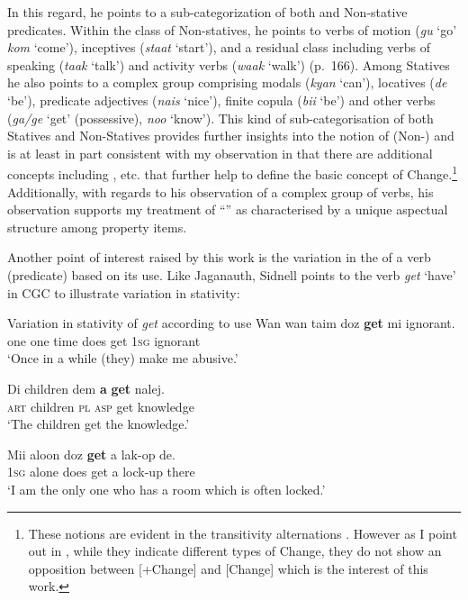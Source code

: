 In this regard, he points to a sub-categorization of both  and
Non-stative predicates.  Within the class of Non-statives, he points to
verbs of motion (\textit{gu} `go' \textit{kom} `come'), inceptives
(\textit{staat} `start'), and a residual class including verbs of
speaking (\textit{taak} `talk') and activity verbs (\textit{waak}
`walk') (p.~166).  Among Statives he also points to a complex group
comprising modals (\textit{kyan} `can'), locatives (\textit{de} `be'),
predicate adjectives (\textit{nais} `nice'), finite copula
(\textit{bii} `be') and other  verbs (\textit{ga/ge} `get'
(possessive), \textit{noo} `know').  This kind of sub-categorisation
of both Statives and Non-Statives provides further insights into the
notion of \mbox{(Non-)} and is at least in part consistent with my
observation in  that there are additional concepts
including \MOTION, \CONTACT etc. that further help to define the basic
concept of Change.\footnote{These notions are evident in the
  transitivity alternations \citep{Levin1993}.  However as I point out
  in , while they indicate different types of Change, they
  do not show an opposition between [+Change] and [\textminus Change] which is
  the interest of this work.}  Additionally, with regards to his
observation of a complex group of  verbs, his observation
supports my treatment of ``'' as characterised by a
unique aspectual structure among property items.

Another point of interest raised by this work is the variation in the
 of a verb (predicate) based on its use.  Like Jaganauth,
Sidnell points to the verb \textit{get} `have' in CGC to illustrate
variation in stativity:

\ea%
\label{ex:2:22}
Variation in stativity of \textit{get}
according to use \citep[167]{Sidnell2002}  
\ea
\gll Wan wan taim  doz \textbf{get} mi ignorant.\\
		one one time does get \textsc{1sg} ignorant\\
\glt `Once in a while (they) make me abusive.'

\ex
    \gll Di children          dem \textbf{a}      \textbf{get} nalej.\\
\textsc{art} children \textsc{pl} \textsc{asp}            get knowledge\\
\glt `The children get the knowledge.'

\ex
   \gll Mii aloon doz \textbf{get} a lak-op    de.\\
\textsc{1sg} alone does         get a lock-up there \\
\glt `I am the only one who has a room which is often locked.' \z \z

